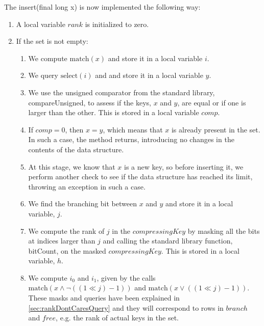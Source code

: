 The {\ttfamily insert(final long x)} is now implemented the following way:
\begin{enumerate}
    \item
    A local variable $rank$ is initialized to zero.
    
    \item
    If the set is not empty:
    \begin{enumerate}
        \item
        We compute $\text{match}(x)$ and store it in a local variable $i$.
        
        \item
        We query $\text{select}(i)$ and and store it in a local variable $y$.
        
        \item
        We use the unsigned comparator from the standard library, {\ttfamily compareUnsigned}, to assess if the keys, $x$ and $y$, are equal or if one is larger than the other. This is stored in a local variable $comp$.
        
        \item
        If $comp = 0$, then $x = y$, which means that $x$ is already present in the set. In such a case, the method returns, introducing no changes in the contents of the data structure.
        
        \item
        At this stage, we know that $x$ is a new key, so before inserting it, we perform another check to see if the data structure has reached its limit, throwing an exception in such a case.
        
        \item
        We find the branching bit between $x$ and $y$ and store it in a local variable, $j$.
        
        \item
        We compute the rank of $j$ in the $compressingKey$ by masking all the bits at indices larger than $j$ and calling the standard library function, {\ttfamily bitCount}, on the masked $compressingKey$. This is stored in a local variable, $h$.
        
        \item
        We compute $i_0$ and $i_1$, given by the calls $\text{match}(x \wedge \neg((1 \ll j) - 1))$ and $\text{match}(x \vee ((1 \ll j) - 1))$. These masks and queries have been explained in \ref{sec:rankDontCaresQuery} and they will correspond to rows in $branch$ and $free$, e.g. the rank of actual keys in the set.
        

\end{enumerate}
\end{enumerate}
